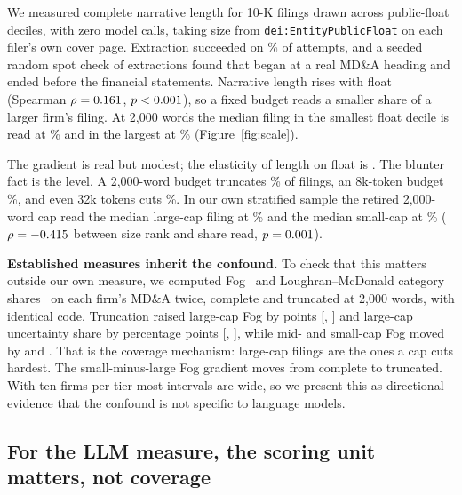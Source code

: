 \documentclass[sigconf,nonacm]{acmart}
\begin{document}
We measured complete narrative length for \ScaleNUsable{} 10-K filings drawn across
public-float deciles, with zero model calls, taking size from
\texttt{dei:EntityPublicFloat} on each filer's own cover page. Extraction succeeded on
\ScaleSuccessPct\% of \ScNAttempted{} attempts, and a seeded random spot check of
\ScSpotN{} extractions found \ScSpotPass{} that began at a real MD\&A heading and ended
before the financial statements. Narrative length rises with float (Spearman
$\rho=0.161$, $p<0.001$), so a fixed budget reads a smaller share of a larger
firm's filing. At 2,000 words the median filing in the smallest float decile is read at
\ScTwoKBot\% and in the largest at \ScTwoKTop\% (Figure~\ref{fig:scale}).

The gradient is real but modest; the elasticity of length on float is
\ScaleElasticity. The blunter fact is the level. A 2,000-word budget truncates
\ScTwoKTrunc\% of filings, an 8k-token budget \ScEightKTrunc\%, and even 32k tokens cuts
\ScThirtyTwoKTrunc\%. In our own stratified sample the retired 2,000-word cap read the
median large-cap filing at \FracReadLarge\% and the median small-cap at
\FracReadSmall\% ($\rho=-0.415$ between size rank and share read,
$p=0.001$).

\textbf{Established measures inherit the confound.} To check that this matters outside
our own measure, we computed Fog~\cite{gunning1952} and Loughran--McDonald
category shares~\cite{lm2011} on each firm's MD\&A twice, complete and truncated at
2,000 words, with identical code. Truncation raised large-cap Fog by \FogDistLarge{}
points [\FogDistLargeLo, \FogDistLargeHi] and large-cap uncertainty share by
\UncDistLarge{} percentage points [\UncDistLargeLo, \UncDistLargeHi], while mid- and
small-cap Fog moved by \FogDistMid{} and \FogDistSmall. That is the coverage mechanism:
large-cap filings are the ones a cap cuts hardest. The small-minus-large Fog gradient
moves from \FogGradComp{} complete to \FogGradTrunc{} truncated. With ten firms per tier
most intervals are wide, so we present this as directional evidence that the confound is
not specific to language models.

\subsection{For the LLM measure, the scoring unit matters, not coverage}
\end{document}
